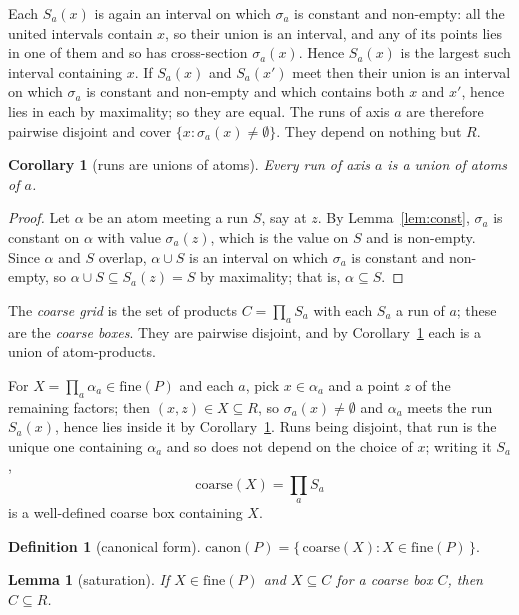 \documentclass[11pt,a4paper]{article}
\theoremstyle{plain}
\newtheorem{lemma}[theorem]{Lemma}
\newtheorem{corollary}[theorem]{Corollary}
\theoremstyle{definition}
\newtheorem{definition}[theorem]{Definition}
\theoremstyle{remark}
\newcommand{\fine}{\mathrm{fine}}
\newcommand{\can}{\mathrm{canon}}
\begin{document}
Each $S_a(x)$ is again an interval on which $\sigma_a$ is constant and non-empty:
all the united intervals contain $x$, so their union is an interval, and any of
its points lies in one of them and so has cross-section $\sigma_a(x)$. Hence
$S_a(x)$ is the largest such interval containing $x$. If $S_a(x)$ and $S_a(x')$
meet then their union is an interval on which $\sigma_a$ is constant and
non-empty and which contains both $x$ and $x'$, hence lies in each by
maximality; so they are equal. The runs of axis $a$ are therefore pairwise
disjoint and cover $\{x : \sigma_a(x) \neq \emptyset\}$. They depend on nothing
but $R$.

\begin{corollary}[runs are unions of atoms]\label{cor:runatom}
Every run of axis $a$ is a union of atoms of $a$.
\end{corollary}

\begin{proof}
Let $\alpha$ be an atom meeting a run $S$, say at $z$. By
Lemma~\ref{lem:const}, $\sigma_a$ is constant on $\alpha$ with value
$\sigma_a(z)$, which is the value on $S$ and is non-empty. Since $\alpha$ and $S$
overlap, $\alpha \cup S$ is an interval on which $\sigma_a$ is constant and
non-empty, so $\alpha \cup S \subseteq S_a(z) = S$ by maximality; that is,
$\alpha \subseteq S$.
\end{proof}

The \emph{coarse grid} is the set of products $C = \prod_{a} S_a$ with each
$S_a$ a run of $a$; these are the \emph{coarse boxes}. They are pairwise disjoint,
and by Corollary~\ref{cor:runatom} each is a union of atom-products.

For $X = \prod_a \alpha_a \in \fine(P)$ and each $a$, pick $x \in \alpha_a$ and a
point $z$ of the remaining factors; then $(x,z) \in X \subseteq R$, so
$\sigma_a(x) \neq \emptyset$ and $\alpha_a$ meets the run $S_a(x)$, hence lies
inside it by Corollary~\ref{cor:runatom}. Runs being disjoint, that run is the
unique one containing $\alpha_a$ and so does not depend on the choice of $x$;
writing it $S_a$,
\[
  \mathrm{coarse}(X) = \prod_a S_a
\]
is a well-defined coarse box containing $X$.

\begin{definition}[canonical form]\label{def:canon}
$\can(P) = \{\, \mathrm{coarse}(X) : X \in \fine(P) \,\}$.
\end{definition}

\begin{lemma}[saturation]\label{lem:sat}
If $X \in \fine(P)$ and $X \subseteq C$ for a coarse box $C$, then $C \subseteq R$.
\end{lemma}
\end{document}
